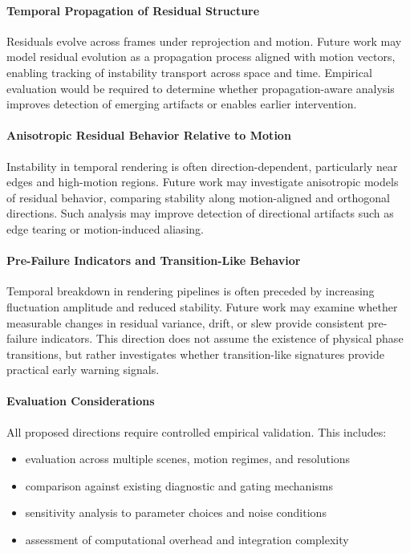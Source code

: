 \documentclass[11pt,letterpaper]{article}
\theoremstyle{gcresult}
\theoremstyle{definition}
\begin{document}
\paragraph{Temporal Propagation of Residual Structure}
Residuals evolve across frames under reprojection and motion. Future work may model residual evolution as a propagation process aligned with motion vectors, enabling tracking of instability transport across space and time. Empirical evaluation would be required to determine whether propagation-aware analysis improves detection of emerging artifacts or enables earlier intervention.

\paragraph{Anisotropic Residual Behavior Relative to Motion}
Instability in temporal rendering is often direction-dependent, particularly near edges and high-motion regions. Future work may investigate anisotropic models of residual behavior, comparing stability along motion-aligned and orthogonal directions. Such analysis may improve detection of directional artifacts such as edge tearing or motion-induced aliasing.

\paragraph{Pre-Failure Indicators and Transition-Like Behavior}
Temporal breakdown in rendering pipelines is often preceded by increasing fluctuation amplitude and reduced stability. Future work may examine whether measurable changes in residual variance, drift, or slew provide consistent pre-failure indicators. This direction does not assume the existence of physical phase transitions, but rather investigates whether transition-like signatures provide practical early warning signals.

\paragraph{Evaluation Considerations}
All proposed directions require controlled empirical validation. This includes:
\begin{itemize}
    \item evaluation across multiple scenes, motion regimes, and resolutions
    \item comparison against existing diagnostic and gating mechanisms
    \item sensitivity analysis to parameter choices and noise conditions
    \item assessment of computational overhead and integration complexity
\end{itemize}
\end{document}
